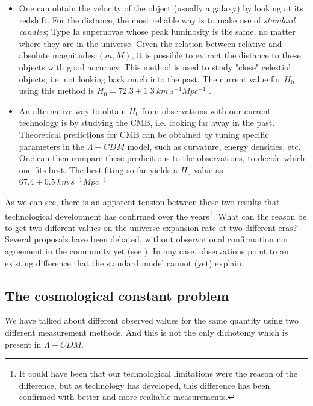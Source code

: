 \documentclass[11pt, a4paper]{article} %
\begin{document}
\begin{itemize}
	\item One can obtain the velocity of the object (usually a galaxy) by looking at its redshift. For the distance, the most reliable way is to make use of \textit{standard candles}; Type Ia supernovae whose peak luminosity is the same, no matter where they are in the universe. Given the relation between relative and absolute magnitudes $(m, M)$, it is possible to extract the distance to these objects with good accuracy. This method is used to study "close" celestial objects, i.e. not looking back much into the past. The current value for $H_{0}$ using this method is $H_{0} = 72.3 \pm 1.3 \: km \:s^{-1} Mpc^{-1}$ \cite{2020planck}.
	
	\item An alternative way to obtain $H_{0}$ from observations with our current technology is by studying the CMB, i.e. looking far away in the past. Theoretical predictions for CMB can be obtained by tuning specific parameters in the $\Lambda- CDM$ model, such as curvature, energy densities, etc. One can then compare these predicitions to the observations, to decide which one fits best. The best fiting so far yields a $H_{0}$ value as $67.4 \pm 0.5 \: km \:s^{-1} Mpc^{-1}$ \cite{Riess_2021}
\end{itemize}

As we can see, there is an apparent tension between these two results that technological development has confirmed over the years\footnote{It could have been that our technological limitations were the reason of the difference, but as technology has developed, this difference has been confirmed with better and more realiable measurements.}. What can the reason be to get two different values on the universe expansion rate at two different eras? Several proposals have been debated, without observational confirmation nor agreement in the community yet (see \cite{di2021realm}). In any case, observations point to an existing difference that the standard model cannot (yet) explain.

\subsection*{The cosmological constant problem}

We have talked about different observed values for the same quantity using two different measurement methods. And this is not the only dichotomy which is present in $\Lambda-CDM$.
\end{document}
